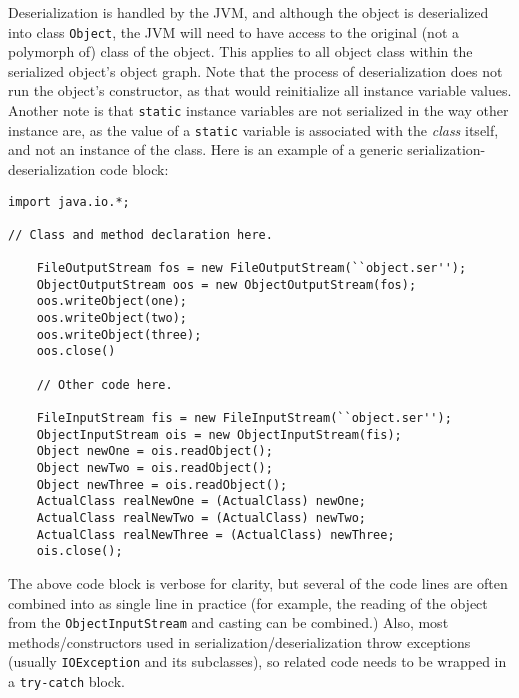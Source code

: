 \documentclass{tufte-handout}
\begin{document}
    Deserialization is handled by the JVM, and although the object is deserialized into class \texttt{Object}, the JVM will need to have access to the original (not a polymorph of) class of the object. This applies to all object class within the serialized object's object graph. Note that the process of deserialization does not run the object's constructor, as that would reinitialize all instance variable values. Another note is that \texttt{static} instance variables are not serialized in the way other instance are, as the value of a \texttt{static} variable is associated with the \emph{class} itself, and not an instance of the class. Here is an example of a generic serialization-deserialization code block:

    \begin{lstlisting}
import java.io.*;

// Class and method declaration here.

    FileOutputStream fos = new FileOutputStream(``object.ser'');
    ObjectOutputStream oos = new ObjectOutputStream(fos);
    oos.writeObject(one);
    oos.writeObject(two);
    oos.writeObject(three);
    oos.close()

    // Other code here.

    FileInputStream fis = new FileInputStream(``object.ser'');
    ObjectInputStream ois = new ObjectInputStream(fis);
    Object newOne = ois.readObject();
    Object newTwo = ois.readObject();
    Object newThree = ois.readObject();
    ActualClass realNewOne = (ActualClass) newOne;
    ActualClass realNewTwo = (ActualClass) newTwo;
    ActualClass realNewThree = (ActualClass) newThree;
    ois.close();
    \end{lstlisting}

    The above code block is verbose for clarity, but several of the code lines are often combined into as single line in practice (for example, the reading of the object from the \texttt{ObjectInputStream} and casting can be combined.) Also, most methods/constructors used in serialization/deserialization throw exceptions (usually \texttt{IOException} and its subclasses), so related code needs to be wrapped in a \texttt{try-catch} block.
\end{document}
